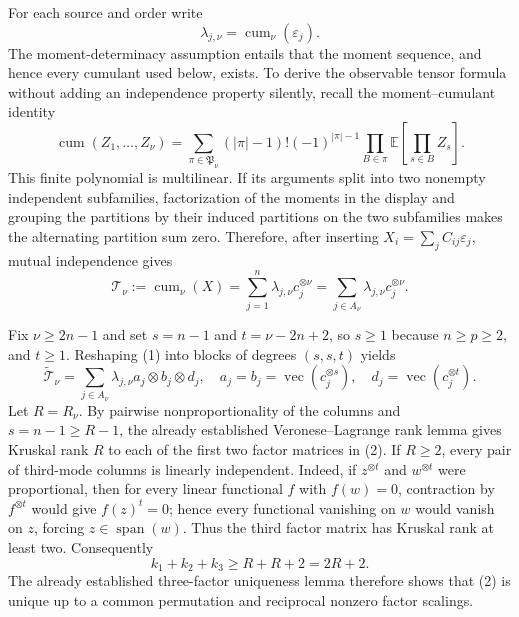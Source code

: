 For each source and order write
\[
 \lambda_{j,\nu}=\operatorname{cum}_\nu(\varepsilon_j).
\]
The moment-determinacy assumption entails that the moment sequence, and hence every cumulant used below, exists. To derive the observable tensor formula without adding an independence property silently, recall the moment--cumulant identity
\[
 \operatorname{cum}(Z_1,\ldots,Z_\nu)
 =\sum_{\pi\in\mathfrak P_\nu}
 (|\pi|-1)!(-1)^{|\pi|-1}
 \prod_{B\in\pi}\mathbb E\!\left[\prod_{s\in B}Z_s\right].
\]
This finite polynomial is multilinear. If its arguments split into two nonempty independent subfamilies, factorization of the moments in the display and grouping the partitions by their induced partitions on the two subfamilies makes the alternating partition sum zero. Therefore, after inserting \(X_i=\sum_j C_{ij}\varepsilon_j\), mutual independence gives
\[
 \mathcal T_\nu:=\operatorname{cum}_\nu(X)
 =\sum_{j=1}^n\lambda_{j,\nu}c_j^{\otimes\nu}
 =\sum_{j\in A_\nu}\lambda_{j,\nu}c_j^{\otimes\nu}.
 \tag{1}
\]

Fix \(\nu\ge2n-1\) and set \(s=n-1\) and \(t=\nu-2n+2\), so \(s\ge1\) because \(n\ge p\ge2\), and \(t\ge1\). Reshaping (1) into blocks of degrees \((s,s,t)\) yields
\[
 \widetilde{\mathcal T}_\nu
 =\sum_{j\in A_\nu}\lambda_{j,\nu}
 a_j\otimes b_j\otimes d_j,
 \quad
 a_j=b_j=\operatorname{vec}(c_j^{\otimes s}),
 \quad
 d_j=\operatorname{vec}(c_j^{\otimes t}).
 \tag{2}
\]
Let \(R=R_\nu\). By pairwise nonproportionality of the columns and \(s=n-1\ge R-1\), the already established Veronese--Lagrange rank lemma gives Kruskal rank \(R\) to each of the first two factor matrices in (2). If \(R\ge2\), every pair of third-mode columns is linearly independent. Indeed, if \(z^{\otimes t}\) and \(w^{\otimes t}\) were proportional, then for every linear functional \(f\) with \(f(w)=0\), contraction by \(f^{\otimes t}\) would give \(f(z)^t=0\); hence every functional vanishing on \(w\) would vanish on \(z\), forcing \(z\in\operatorname{span}(w)\). Thus the third factor matrix has Kruskal rank at least two. Consequently
\[
 k_1+k_2+k_3\ge R+R+2=2R+2.
\]
The already established three-factor uniqueness lemma therefore shows that (2) is unique up to a common permutation and reciprocal nonzero factor scalings.

